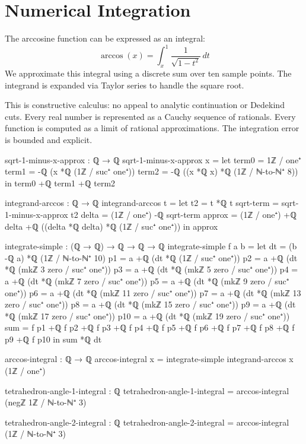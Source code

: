 \documentclass[11pt,a4paper]{book}
\begin{document}
\section{Numerical Integration}

The arccosine function can be expressed as an integral:
\[
\arccos(x) = \int_x^1 \frac{1}{\sqrt{1-t^2}} \, dt
\]
We approximate this integral using a discrete sum over ten sample points.
The integrand is expanded via Taylor series to handle the square root.

This is constructive calculus: no appeal to analytic continuation or Dedekind cuts.
Every real number is represented as a Cauchy sequence of rationals. Every function is computed as a limit of rational approximations.
The integration error is bounded and explicit.

\begin{code}
sqrt-1-minus-x-approx : ℚ → ℚ
sqrt-1-minus-x-approx x = 
  let term0 = 1ℤ / one⁺
      term1 = -ℚ (x *ℚ (1ℤ / suc⁺ one⁺))
      term2 = -ℚ ((x *ℚ x) *ℚ (1ℤ / ℕ-to-ℕ⁺ 8))
  in term0 +ℚ term1 +ℚ term2

integrand-arccos : ℚ → ℚ
integrand-arccos t =
  let t2 = t *ℚ t
      sqrt-term = sqrt-1-minus-x-approx t2
      delta = (1ℤ / one⁺) -ℚ sqrt-term
      approx = (1ℤ / one⁺) +ℚ delta +ℚ ((delta *ℚ delta) *ℚ (1ℤ / suc⁺ one⁺))
  in approx


integrate-simple : (ℚ → ℚ) → ℚ → ℚ → ℚ
integrate-simple f a b =
  let dt = (b -ℚ a) *ℚ (1ℤ / ℕ-to-ℕ⁺ 10)
      p1 = a +ℚ (dt *ℚ (1ℤ / suc⁺ one⁺))
      p2 = a +ℚ (dt *ℚ (mkℤ 3 zero / suc⁺ one⁺))
      p3 = a +ℚ (dt *ℚ (mkℤ 5 zero / suc⁺ one⁺))
      p4 = a +ℚ (dt *ℚ (mkℤ 7 zero / suc⁺ one⁺))
      p5 = a +ℚ (dt *ℚ (mkℤ 9 zero / suc⁺ one⁺))
      p6 = a +ℚ (dt *ℚ (mkℤ 11 zero / suc⁺ one⁺))
      p7 = a +ℚ (dt *ℚ (mkℤ 13 zero / suc⁺ one⁺))
      p8 = a +ℚ (dt *ℚ (mkℤ 15 zero / suc⁺ one⁺))
      p9 = a +ℚ (dt *ℚ (mkℤ 17 zero / suc⁺ one⁺))
      p10 = a +ℚ (dt *ℚ (mkℤ 19 zero / suc⁺ one⁺))
      sum = f p1 +ℚ f p2 +ℚ f p3 +ℚ f p4 +ℚ f p5 +ℚ f p6 +ℚ f p7 +ℚ f p8 +ℚ f p9 +ℚ f p10
  in sum *ℚ dt

arccos-integral : ℚ → ℚ
arccos-integral x = integrate-simple integrand-arccos x (1ℤ / one⁺)

tetrahedron-angle-1-integral : ℚ
tetrahedron-angle-1-integral = arccos-integral (negℤ 1ℤ / ℕ-to-ℕ⁺ 3)

tetrahedron-angle-2-integral : ℚ  
tetrahedron-angle-2-integral = arccos-integral (1ℤ / ℕ-to-ℕ⁺ 3)
\end{code}
\end{document}
